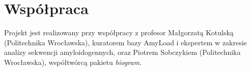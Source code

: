 \documentclass{article}
\begin{document}
\section{Współpraca}

Projekt jest realizowany przy współpracy z profesor Małgorzatą Kotulską (Politechnika Wrocławska), kuratorem bazy AmyLoad i ekspertem w zakresie analizy sekwencji amyloidogennych, oraz Piotrem Sobczykiem (Politechnika Wrocławska), współtwórcą pakietu \textit{biogram}.


 

\end{document}
